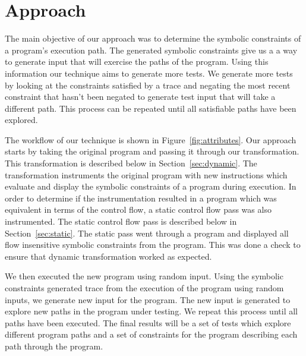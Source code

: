 \section{Approach}

The main objective of our approach was to determine the symbolic constraints of a program's execution path. The generated symbolic constraints give us a a way to generate input that will exercise the paths of the program. Using this information our technique aims to generate more tests. We generate more tests by looking at the constraints satisfied by a trace and negating the most recent constraint that hasn't been negated to generate test input that will take a different path. This process can be repeated until all satisfiable paths have been explored. 

The workflow of our technique is shown in Figure~\ref{fig:attributes}. Our approach starts by taking the original program and passing it through our transformation. This transformation is described below in Section~\ref{sec:dynamic}. The transformation instruments the original program with new instructions which evaluate and display the symbolic constraints of a program during execution. In order to determine if the instrumentation resulted in a program which was equivalent in terms of the control flow, a static control flow pass was also instrumented. The static control flow pass is described below in Section~\ref{sec:static}. The static pass went through a program and displayed all flow insensitive symbolic constraints from the program. This was done a check to ensure that dynamic transformation worked as expected.

We then executed the new program using random input. Using the symbolic constraints generated trace from the execution of the program using random inputs, we generate new input for the program. The new input is generated to explore new paths in the program under testing. We repeat this process until all paths have been executed. The final results will be a set of tests which explore different program paths and a set of constraints for the program describing each path through the program. 

